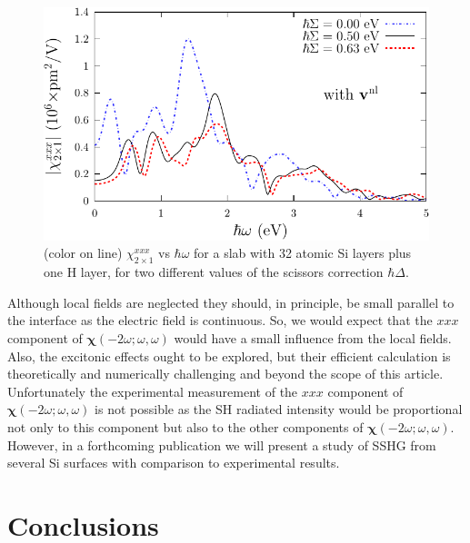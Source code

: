 \documentclass[floatfix,prb,aps,superscriptaddress,showpacs,11pt,preprint,letterpaper]{revtex4}
\begin{document}
\begin{figure}
\centering 
\includegraphics[scale=.8]{fig6}
\caption{(color on line) 
$\chi^{xxx}_{2\times 1}$
vs $\hbar\omega$ for a slab with 32 
atomic Si layers plus one H layer, 
for two different values of 
the scissors correction $\hbar\Delta$. 
\label{fig4}} 
\end{figure}

Although local fields are neglected they should, in principle, 
be small parallel to the interface as the electric field is continuous.
So, we would expect that the $xxx$ component of 
$\boldsymbol{\chi}(-2\omega;\omega,\omega)$ 
would have a small influence from the local fields.
Also, the excitonic effects ought to be explored, but
their efficient calculation is theoretically and 
numerically challenging\cite{beyond}   and beyond the scope 
of this article.
Unfortunately the experimental measurement of the $xxx$
component of $\boldsymbol{\chi}(-2\omega;\omega,\omega)$ is not possible as the SH 
radiated intensity would be proportional not only to this component 
but also to the other components of $\boldsymbol{\chi}(-2\omega;\omega,\omega)$.  
However,
in a forthcoming publication 
we will present a study of SSHG from several 
Si surfaces 
with comparison to experimental 
results. 

\section{Conclusions}\label{conc}
\end{document}
